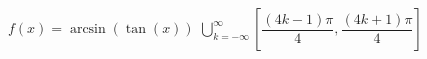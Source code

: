 { $f(x) = \arcsin(\tan(x))$ }
{ $\displaystyle \bigcup_{k=-\infty}^{\infty} \left[ \dfrac{(4k - 1)\pi}{4}, \dfrac{(4k+1)\pi}{4} \right]$}
